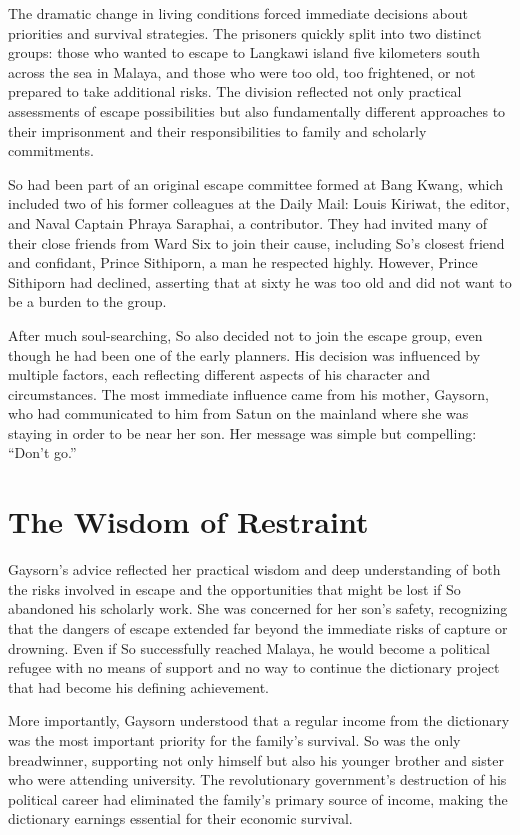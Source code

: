 \documentclass[
  Letterpaper,
]{scrbook}
\begin{document}
The dramatic change in living conditions forced immediate decisions
about priorities and survival strategies. The prisoners quickly split
into two distinct groups: those who wanted to escape to Langkawi island
five kilometers south across the sea in Malaya, and those who were too
old, too frightened, or not prepared to take additional risks. The
division reflected not only practical assessments of escape
possibilities but also fundamentally different approaches to their
imprisonment and their responsibilities to family and scholarly
commitments.

So had been part of an original escape committee formed at Bang Kwang,
which included two of his former colleagues at the Daily Mail: Louis
Kiriwat, the editor, and Naval Captain Phraya Saraphai, a contributor.
They had invited many of their close friends from Ward Six to join their
cause, including So's closest friend and confidant, Prince Sithiporn, a
man he respected highly. However, Prince Sithiporn had declined,
asserting that at sixty he was too old and did not want to be a burden
to the group.

After much soul-searching, So also decided not to join the escape group,
even though he had been one of the early planners. His decision was
influenced by multiple factors, each reflecting different aspects of his
character and circumstances. The most immediate influence came from his
mother, Gaysorn, who had communicated to him from Satun on the mainland
where she was staying in order to be near her son. Her message was
simple but compelling: ``Don't go.''

\section{The Wisdom of Restraint}\label{the-wisdom-of-restraint}

Gaysorn's advice reflected her practical wisdom and deep understanding
of both the risks involved in escape and the opportunities that might be
lost if So abandoned his scholarly work. She was concerned for her son's
safety, recognizing that the dangers of escape extended far beyond the
immediate risks of capture or drowning. Even if So successfully reached
Malaya, he would become a political refugee with no means of support and
no way to continue the dictionary project that had become his defining
achievement.

More importantly, Gaysorn understood that a regular income from the
dictionary was the most important priority for the family's survival. So
was the only breadwinner, supporting not only himself but also his
younger brother and sister who were attending university. The
revolutionary government's destruction of his political career had
eliminated the family's primary source of income, making the dictionary
earnings essential for their economic survival.
\end{document}
